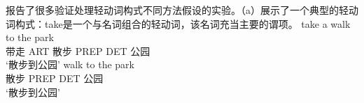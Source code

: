 \begin{exe}
\begin{xlist}[iv.]
\begin{exe}
\begin{xlist}[iv.]
\citet*{WJKP2014a}报告了很多验证处理轻动词构式不同方法假设的实验。（a）展示了一个典型的轻动词构式：take是一个与名词组合的轻动词，该名词充当主要的谓项。
\eal
\ex 
\gll take a walk to the park\\
     带走 ART 散步 PREP DET 公园\\
\glt `散步到公园'
\ex
\gll walk to the park\\
     散步 PREP DET 公园\\
\glt `散步到公园' 
\zl


\end{xlist}
\end{exe}
\end{xlist}
\end{exe}

